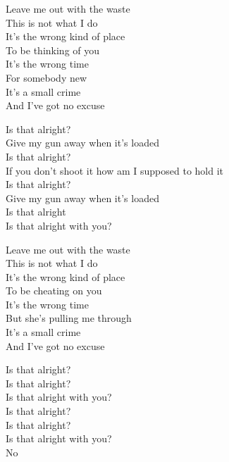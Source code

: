 
\ve{}
Leave me out with the waste\\
This is not what I do\\
It's the wrong kind of place\\
To be thinking of you\\
It's the wrong time\\
For somebody new\\
It's a small crime\\
And I've got no excuse

\cho{}
Is that alright?\\
Give my gun away when it's loaded\\
Is that alright?\\
If you don't shoot it how am I supposed to hold it\\
Is that alright?\\
Give my gun away when it's loaded\\
Is that alright\\
Is that alright with you?

\ve{}
Leave me out with the waste\\
This is not what I do\\
It's the wrong kind of place\\
To be cheating on you\\
It's the wrong time\\
But she's pulling me through\\
It's a small crime\\
And I've got no excuse

\cho{}
Is that alright?\\
Is that alright?\\
Is that alright with you?\\
Is that alright?\\
Is that alright?\\
Is that alright with you?\\
No

\esong